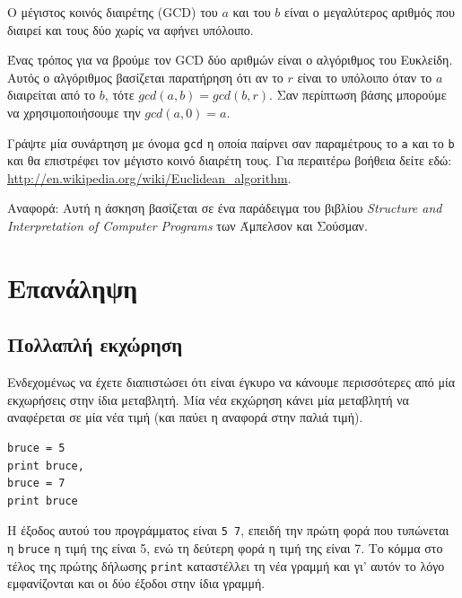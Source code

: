 \documentclass[10pt]{book}
\begin{document}
\begin{exercise}

Ο μέγιστος κοινός διαιρέτης (GCD) του $a$ και του $b$
είναι ο μεγαλύτερος αριθμός που διαιρεί και τους δύο χωρίς να αφήνει υπόλοιπο.

Ένας τρόπος για να βρούμε τον GCD δύο αριθμών είναι ο
αλγόριθμος του Ευκλείδη. Αυτός ο αλγόριθμος βασίζεται παρατήρηση ότι αν
το $r$ είναι το υπόλοιπο όταν το $a$ διαιρείται από
το $b$, τότε $gcd(a, b) = gcd(b, r)$. Σαν περίπτωση βάσης μπορούμε να χρησιμοποιήσουμε την $gcd(a, 0) = a$.

Γράψτε μία συνάρτηση με όνομα \verb"gcd" η οποία παίρνει
σαν παραμέτρους το {\tt a} και το {\tt b} και θα
επιστρέφει τον μέγιστο κοινό διαιρέτη τους. Για περαιτέρω βοήθεια
δείτε εδώ: \url{http://en.wikipedia.org/wiki/Euclidean_algorithm}.


Αναφορά: Αυτή η άσκηση βασίζεται σε ένα παράδειγμα του
βιβλίου {\em Structure and Interpretation of Computer Programs}
των Άμπελσον και Σούσμαν.

\end{exercise}


\chapter{Επανάληψη}

\section{Πολλαπλή εκχώρηση}

Ενδεχομένως να έχετε διαπιστώσει ότι είναι έγκυρο να κάνουμε περισσότερες
από μία εκχωρήσεις στην ίδια μεταβλητή. Μία νέα εκχώρηση κάνει μία μεταβλητή
να αναφέρεται σε μία νέα τιμή (και παύει η αναφορά στην παλιά τιμή). 

\begin{verbatim}
bruce = 5
print bruce,
bruce = 7
print bruce
\end{verbatim}
%

Η έξοδος αυτού του προγράμματος είναι {\tt 5 7}, επειδή την
πρώτη φορά που τυπώνεται η {\tt bruce} η τιμή της είναι 5,
ενώ τη δεύτερη φορά η τιμή της είναι 7. Το κόμμα στο τέλος της πρώτης
δήλωσης {\tt print} καταστέλλει τη νέα γραμμή και γι' αυτόν το λόγο
εμφανίζονται και οι δύο έξοδοι στην ίδια γραμμή.
\end{document}

